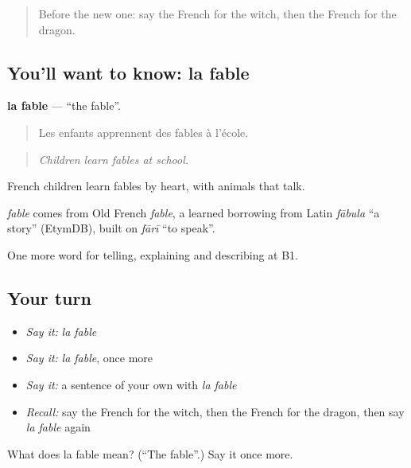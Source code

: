 \label{lesson:FR-C321-fable}



\begin{quote}
Before the new one: say the French for the witch, then the French for the dragon.
\end{quote}

\subsection*{You'll want to know: la fable}
\textbf{la fable} — \textquotedblleft{}the fable\textquotedblright{}.

\begin{quote}
Les enfants apprennent des fables à l'école.
\end{quote}

\begin{quote}
\emph{Children learn fables at school.}
\end{quote}

French children learn fables by heart, with animals that talk.

\begin{cousinweb}
\emph{fable} comes from Old French \emph{fable}, a learned borrowing from Latin \emph{fābula} \textquotedblleft{}a story\textquotedblright{} (EtymDB), built on \emph{fārī} \textquotedblleft{}to speak\textquotedblright{}.
\end{cousinweb}

\begin{grammarlens}[title={What you've built}]
One more word for telling, explaining and describing at B1.
\end{grammarlens}

\subsection*{Your turn}
\begin{itemize}
\raggedright
  \item \emph{Say it:} \emph{la fable}
  \item \emph{Say it:} \emph{la fable}, once more
  \item \emph{Say it:} a sentence of your own with \emph{la fable}
  \item \emph{Recall:} say the French for the witch, then the French for the dragon, then say \emph{la fable} again
\end{itemize}

\begin{tcolorbox}[breakable,colback=teal!4,colframe=teal!35!black,title={Before you move on}]
What does la fable mean? (\textquotedblleft{}The fable\textquotedblright{}.) Say it once more.
\end{tcolorbox}
